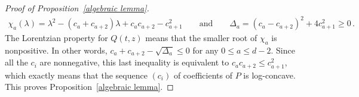 \documentclass[10pt,a4paper]{amsart}
\begin{document}
\begin{proof}[Proof of Proposition~\ref{algebraic lemma}]
\begin{align*}
 \chi_a(\lambda)   %
   =  \lambda^2 - (c_a + c_{a+2}) \lambda + c_a c_{a+2} - c_{a+1}^2 
   \qquad 
   \mbox{and}
   \qquad 
   \Delta_a = (c_a - c_{a+2})^2 + 4 c_{a+1}^2 \geq 0 \,.
\end{align*}
The Lorentzian property for $Q(t,z)$ means that the smaller root of $\chi_a$ is nonpositive. In other words, $c_a + c_{a+2} - \sqrt{\Delta_a} \leq 0$ for any $0 \leq a \leq d-2$. Since all the $c_i$ are nonnegative, this last inequality is equivalent to $c_a c_{a+2} \leq c_{a+1}^2$, which exactly means that the sequence $(c_i)$ of coefficients of $P$ is log-concave. This proves Proposition~\ref{algebraic lemma}.
\end{proof}
\end{document}
